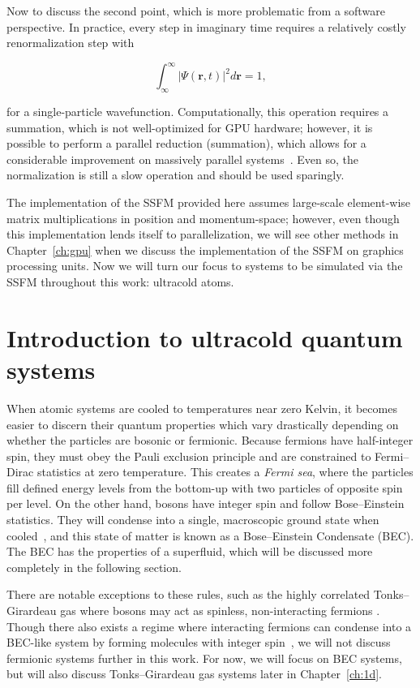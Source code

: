 Now to discuss the second point, which is more problematic from a software perspective.
In practice, every step in imaginary time requires a relatively costly renormalization step with

\begin{equation}
    \label{eqn:norm}
    \int_\infty^\infty |\Psi(\mathbf{r},t)|^2 d\mathbf{r} = 1,
\end{equation}

\noindent for a single-particle wavefunction.
Computationally, this operation requires a summation, which is not well-optimized for GPU hardware; however, it is possible to perform a parallel reduction (summation), which allows for a considerable improvement on massively parallel systems~\cite{harris2007}.
Even so, the normalization is still a slow operation and should be used sparingly.

The implementation of the SSFM provided here assumes large-scale element-wise matrix multiplications in position and momentum-space; however, even though this implementation lends itself to parallelization, we will see other methods in Chapter~\ref{ch:gpu} when we discuss the implementation of the SSFM on graphics processing units.
Now we will turn our focus to systems to be simulated via the SSFM throughout this work: ultracold atoms.

\section{Introduction to ultracold quantum systems}
\label{sec:intro}

When atomic systems are cooled to temperatures near zero Kelvin, it becomes easier to discern their quantum properties which vary drastically depending on whether the particles are bosonic or fermionic.
Because fermions have half-integer spin, they must obey the Pauli exclusion principle and are constrained to Fermi--Dirac statistics at zero temperature.
This creates a \textit{Fermi sea}, where the particles fill defined energy levels from the bottom-up with two particles of opposite spin per level.
On the other hand, bosons have integer spin and follow Bose--Einstein statistics.
They will condense into a single, macroscopic ground state when cooled~\cite{einstein1925, fetter2003}, and
this state of matter is known as a Bose--Einstein Condensate (BEC).
The BEC has the properties of a superfluid, which will be discussed more completely in the following section.

There are notable exceptions to these rules, such as the highly correlated Tonks--Girardeau gas where bosons may act as spinless, non-interacting fermions \cite{girardeau1960, schloss2016}.
Though there also exists a regime where interacting fermions can condense into a BEC-like system by forming molecules with integer spin~\cite{nozieres1985, bulgac2014}, we will not discuss fermionic systems further in this work.
For now, we will focus on BEC systems, but will also discuss Tonks--Girardeau gas systems later in Chapter~\ref{ch:1d}.

